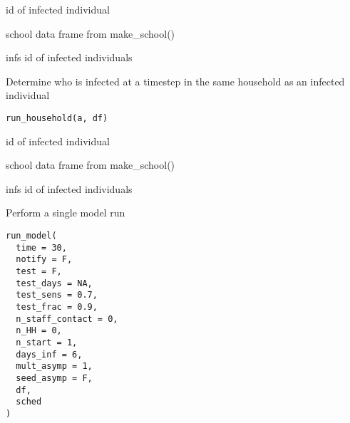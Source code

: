 \documentclass[a4paper]{book}
\begin{document}
%
\begin{Arguments}
\begin{ldescription}
\item[\code{a}] id of infected individual

\item[\code{df}] school data frame from make\_school()
\end{ldescription}
\end{Arguments}
%
\begin{Value}
infs id of infected individuals
\end{Value}
%
\begin{Description}\relax
Determine who is infected at a timestep
in the same household as an infected individual
\end{Description}
%
\begin{Usage}
\begin{verbatim}
run_household(a, df)
\end{verbatim}
\end{Usage}
%
\begin{Arguments}
\begin{ldescription}
\item[\code{a}] id of infected individual

\item[\code{df}] school data frame from make\_school()
\end{ldescription}
\end{Arguments}
%
\begin{Value}
infs id of infected individuals
\end{Value}
%
\begin{Description}\relax
Perform a single model run
\end{Description}
%
\begin{Usage}
\begin{verbatim}
run_model(
  time = 30,
  notify = F,
  test = F,
  test_days = NA,
  test_sens = 0.7,
  test_frac = 0.9,
  n_staff_contact = 0,
  n_HH = 0,
  n_start = 1,
  days_inf = 6,
  mult_asymp = 1,
  seed_asymp = F,
  df,
  sched
)
\end{verbatim}
\end{Usage}
%
\end{document}
